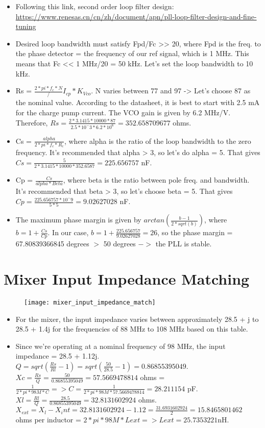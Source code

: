 \documentclass[12pt, letterpaper]{article}
\begin{document}
\begin{itemize}
    \item Following this link, second order loop filter design: \url{https://www.renesas.cn/cn/zh/document/apn/pll-loop-filter-design-and-fine-tuning}
    \item Desired loop bandwidth must satisfy Fpd/Fc >> 20, where Fpd is the freq. to the phase detector = the frequency of our ref signal, which is 1 MHz. This means that Fc << 1 MHz/20 = 50 kHz. Let's set the loop bandwidth to 10 kHz.
    \item Rs = \(\frac{2*pi*f_c*N}/{I_{cp}*K_{Vco}}\). N varies between 77 and 97 -> Let's choose 87 as the nominal value. According to the datasheet, it is best to start with 2.5 mA for the charge pump current. The VCO gain is given by 6.2 MHz/V. Therefore, \(Rs = \frac{2*3.1415*10000*87}{2.5*10^-3*6.2*10^6} = 352.658709677\) ohms. 
    \item Cs = \(\frac{alpha}{2*pi*f_c*R_c}\), where alpha is the ratio of the loop bandwidth to the zero frequency. It's recommended that alpha > 3, so let's do alpha = 5. That gives \(Cs = \frac{5}{2*3.1415*10000*352.6587} = 225.656757\) nF.
    \item Cp = \(\frac{Cs}{alpha*Beta}\), where beta is the ratio between pole freq. and bandwidth. It's recommended that beta > 3, so let's choose beta = 5. That gives \(Cp = \frac{225.656757*10^-9}{5*5} = 9.02627028\) nF.
    \item The maximum phase margin is given by \(arctan(\frac{b-1}{2*sqrt(b)})\), where \(b = 1 + \frac{Cs}{Cp}\). In our case, \(b = 1 + \frac{225.656757}{9.02627028} = 26\), so the phase margin = 67.80839366845 degrees \(>\) 50 degrees \(->\) the PLL is stable.
\end{itemize}

\section{Mixer Input Impedance Matching}

\begin{figure}[h]
    \texttt{[image: mixer\_input\_impedance\_match]}
\end{figure}

\begin{itemize}
    \item For the mixer, the input impedance varies between approximately 28.5 + j to 28.5 + 1.4j for the frequencies of 88 MHz to 108 MHz based on this table. 
    \item Since we're operating at a nominal frequency of 98 MHz, the input impedance = 28.5 + 1.12j. \(Q = sqrt(\frac{Rs}{Rl} - 1) = sqrt(\frac{50}{28.5} - 1) = 0.86855395049\). \(Xc = \frac{Rs}{Q} = \frac{50}{0.86855395049} = 57.5669478814 \) ohms = \( \frac{1}{2*pi*98M*C} => C = \frac{1}{2*pi*98M*57.5669478814} = 28.211154 \) pF. \( Xl = \frac{Rl}{Q} = \frac{28.5}{0.86855395049} = 32.8131602924 \) ohms. \( X_{ext} = X_l - X_int = 32.8131602924 - 1.12 = \frac{31.6931602924}{2} = 15.8465801462 \) ohms per inductor = \(2*pi*98M*Lext => Lext = 25.7353221 \)nH.
\end{itemize}
\end{document}
